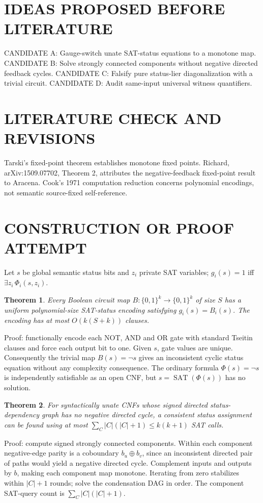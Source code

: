 \documentclass{article}
\newtheorem{theorem}{Theorem}
\begin{document}
\section{IDEAS PROPOSED BEFORE LITERATURE}
CANDIDATE A: Gauge-switch unate SAT-status equations to a monotone map.
CANDIDATE B: Solve strongly connected components without negative directed feedback cycles.
CANDIDATE C: Falsify pure status-lier diagonalization with a trivial circuit.
CANDIDATE D: Audit same-input universal witness quantifiers.
\section{LITERATURE CHECK AND REVISIONS}
Tarski's fixed-point theorem establishes monotone fixed points. Richard,
arXiv:1509.07702, Theorem 2, attributes the negative-feedback fixed-point
result to Aracena. Cook's 1971 computation reduction concerns polynomial
encodings, not semantic source-fixed self-reference.
\section{CONSTRUCTION OR PROOF ATTEMPT}
Let $s$ be global semantic status bits and $z_i$ private SAT variables;
$g_i(s)=1$ iff $\exists z_i\,\Phi_i(s,z_i)$.
\begin{theorem}
Every Boolean circuit map $B:\{0,1\}^k\to\{0,1\}^k$ of size $S$
has a uniform polynomial-size SAT-status encoding satisfying
$g_i(s)=B_i(s)$. The encoding has at most $O(k(S+k))$ clauses.
\end{theorem}
Proof: functionally encode each NOT, AND and OR gate with standard Tseitin
clauses and force each output bit to one. Given $s$, gate values are unique.
Consequently the trivial map $B(s)=\neg s$ gives an inconsistent cyclic status
equation without any complexity consequence. The ordinary formula
$\Phi(s)=\neg s$ is independently satisfiable as an open CNF, but
$s=\operatorname{SAT}(\Phi(s))$ has no solution.
\begin{theorem}
For syntactically unate CNFs whose signed directed status-dependency graph
has no negative directed cycle, a consistent status assignment can be found
using at most $\sum_C|C|(|C|+1)\le k(k+1)$ SAT calls.
\end{theorem}
Proof: compute signed strongly connected components. Within each component
negative-edge parity is a coboundary $b_u\oplus b_v$, since an inconsistent
directed pair of paths would yield a negative directed cycle. Complement
inputs and outputs by $b$, making each component map monotone. Iterating
from zero stabilizes within $|C|+1$ rounds; solve the condensation DAG in order.
The component SAT-query count is $\sum_C|C|(|C|+1)$.
\end{document}
